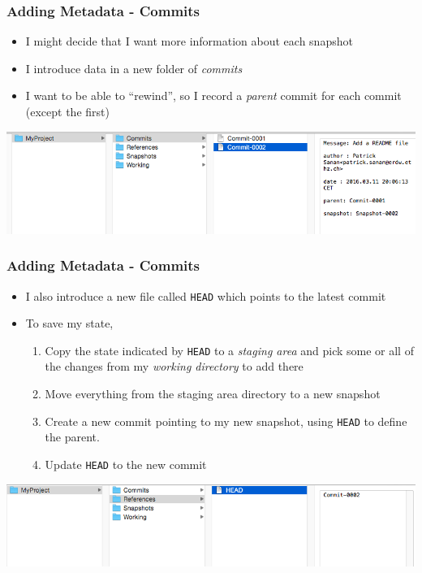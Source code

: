 \begin{frame}[fragile]
\frametitle{Adding Metadata - Commits}
\begin{itemize}
\item I might decide that I want more information about each snapshot
\item I introduce data in a new folder of \emph{commits}
\item I want to be able to ``rewind'', so I record a \emph{parent} commit for each commit (except the first)
\end{itemize}
\includegraphics[scale=0.4]{commit1.png}\\
\end{frame}

\begin{frame}[fragile]
\frametitle{Adding Metadata - Commits}
\begin{itemize}
\item I also introduce a new file called \texttt{HEAD} which points to the latest commit
\item To save my state,
\begin{enumerate}
\item Copy the state indicated by \texttt{HEAD} to a \emph{staging area} and pick some or all of the changes from my \emph{working directory} to add there
\item Move everything from  the staging area directory to a new snapshot
\item Create a new commit pointing to my new snapshot, using \texttt{HEAD} to define the parent.
\item Update \texttt{HEAD} to the new commit
\end{enumerate}
\end{itemize}
\includegraphics[scale=0.4]{commit2.png}
\end{frame}

